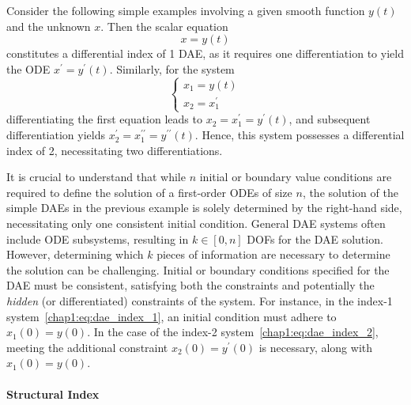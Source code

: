 \begin{example}
  Consider the following simple examples involving a given smooth function $y(t)$ and the unknown $x$. Then the scalar equation
  \begin{equation}
    x = y(t)
    \label{chap1:eq:dae_index_1}
  \end{equation}
  constitutes a differential index of 1 \ac{DAE}, as it requires one differentiation to yield the \ac{ODE} $x^{\prime} = y^{\prime}(t)$. Similarly, for the system
  \begin{equation}
    \begin{cases}
      x_1 = y(t) \\
      x_2 = x_1^{\prime}
    \end{cases}
    \label{chap1:eq:dae_index_2}
  \end{equation}
  differentiating the first equation leads to $x_2 = x_1^{\prime} = y^{\prime}(t)$, and subsequent differentiation yields $x_2^{\prime} = x_1^{\prime\prime} = y^{\prime\prime}(t)$. Hence, this system possesses a differential index of 2, necessitating two differentiations.
\end{example}

It is crucial to understand that while $n$ initial or boundary value conditions are required to define the solution of a first-order \acp{ODE} of size $n$, the solution of the simple \acp{DAE} in the previous example is solely determined by the right-hand side, necessitating only one consistent initial condition. General \ac{DAE} systems often include \ac{ODE} subsystems, resulting in $k \in [0, n]$ \acp{DOF} for the \ac{DAE} solution. However, determining which $k$ pieces of information are necessary to determine the solution can be challenging. Initial or boundary conditions specified for the \ac{DAE} must be consistent, satisfying both the constraints and potentially the \emph{hidden} (or differentiated) constraints of the system. For instance, in the index-1 system~\eqref{chap1:eq:dae_index_1}, an initial condition must adhere to $x_1(0) = y(0)$. In the case of the index-2 system~\eqref{chap1:eq:dae_index_2}, meeting the additional constraint $x_2(0) = y^{\prime}(0)$ is necessary, along with $x_1(0) = y(0)$.

\paragraph{Structural Index}

